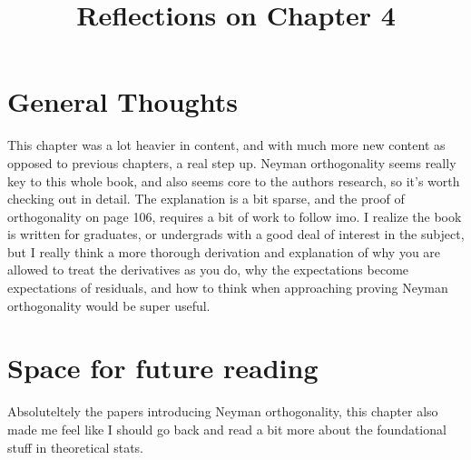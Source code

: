 \documentclass[10pt, english]{article}
\begin{document}
\title{Reflections on Chapter 4}
\date{}
\author{}

\maketitle


\section*{General Thoughts}
This chapter was a lot heavier in content, and with much more new content as opposed to previous chapters, a real step up. Neyman orthogonality seems really key to this whole book,
and also seems core to the authors research, so it's worth checking out in detail. The explanation is a bit sparse, and the proof of orthogonality on page 106, requires a bit of work 
to follow imo. I realize the book is written for graduates, or undergrads with a good deal of interest in the subject, but I really think a more thorough derivation and 
explanation of why you are allowed to treat the derivatives as you do, why the expectations become expectations of residuals, and how to think when approaching proving Neyman 
orthogonality would be super useful.

\section*{Space for future reading}
Absoluteltely the papers introducing Neyman orthogonality, this chapter also made me feel like I should go back and read a bit more about the foundational stuff in theoretical stats. 
\end{document}
